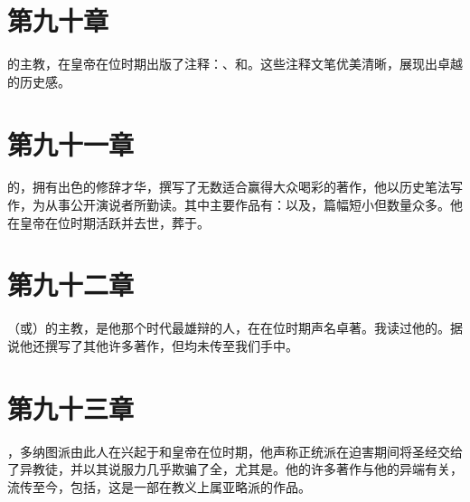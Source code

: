 
\section{第九十章}

的主教，在皇帝在位时期出版了注释：、和。这些注释文笔优美清晰，展现出卓越的历史感。\par


\section{第九十一章}

的，拥有出色的修辞才华，撰写了无数适合赢得大众喝彩的著作，他以历史笔法写作，为从事公开演说者所勤读。其中主要作品有：以及，篇幅短小但数量众多。他在皇帝在位时期活跃并去世，葬于。\par


\section{第九十二章}

（或）的主教，是他那个时代最雄辩的人，在在位时期声名卓著。我读过他的。据说他还撰写了其他许多著作，但均未传至我们手中。\par


\section{第九十三章}

，多纳图派由此人在兴起于和皇帝在位时期，他声称正统派在迫害期间将圣经交给了异教徒，并以其说服力几乎欺骗了全，尤其是。他的许多著作与他的异端有关，流传至今，包括，这是一部在教义上属亚略派的作品。\par

